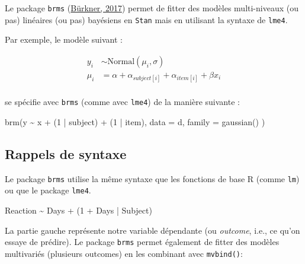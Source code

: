 \documentclass[
  a4paper,11pt,twoside,onecolumn,openright,final,oldfontcommands]{memoir}
\newenvironment{Shaded}{\begin{snugshade}}{\end{snugshade}}
\newcommand{\AttributeTok}[1]{\textcolor[rgb]{0.77,0.63,0.00}{#1}}
\newcommand{\DecValTok}[1]{\textcolor[rgb]{0.00,0.00,0.81}{#1}}
\newcommand{\FunctionTok}[1]{\textcolor[rgb]{0.00,0.00,0.00}{#1}}
\newcommand{\NormalTok}[1]{#1}
\newcommand{\SpecialCharTok}[1]{\textcolor[rgb]{0.00,0.00,0.00}{#1}}
\theoremstyle{definition}
\theoremstyle{definition}
\theoremstyle{definition}
\theoremstyle{remark}
\begin{document}
Le package \texttt{brms} (\href{https://www.jstatsoft.org/article/view/v080i01}{Bürkner, 2017}) permet de fitter des modèles multi-niveaux (ou pas) linéaires (ou pas) bayésiens en \texttt{Stan} mais en utilisant la syntaxe de \texttt{lme4}.

Par exemple, le modèle suivant :

\[
\begin{aligned}
y_{i} &\sim \mathrm{Normal}(\mu_{i}, \sigma) \\
\mu_{i} &= \alpha + \alpha_{subject[i]} + \alpha_{item[i]} + \beta x_{i} \\
\end{aligned}
\]

se spécifie avec \texttt{brms} (comme avec \texttt{lme4}) de la manière suivante :

\begin{Shaded}
\begin{Highlighting}[]
\FunctionTok{brm}\NormalTok{(y }\SpecialCharTok{\textasciitilde{}}\NormalTok{ x }\SpecialCharTok{+}\NormalTok{ (}\DecValTok{1} \SpecialCharTok{|}\NormalTok{ subject) }\SpecialCharTok{+}\NormalTok{ (}\DecValTok{1} \SpecialCharTok{|}\NormalTok{ item), }\AttributeTok{data =}\NormalTok{ d, }\AttributeTok{family =} \FunctionTok{gaussian}\NormalTok{() )}
\end{Highlighting}
\end{Shaded}

\hypertarget{rappels-de-syntaxe}{%
\subsection{Rappels de syntaxe}\label{rappels-de-syntaxe}}

Le package \texttt{brms} utilise la même syntaxe que les fonctions de base R (comme \texttt{lm}) ou que le package \texttt{lme4}.

\begin{Shaded}
\begin{Highlighting}[]
\NormalTok{Reaction }\SpecialCharTok{\textasciitilde{}}\NormalTok{ Days }\SpecialCharTok{+}\NormalTok{ (}\DecValTok{1} \SpecialCharTok{+}\NormalTok{ Days }\SpecialCharTok{|}\NormalTok{ Subject)}
\end{Highlighting}
\end{Shaded}

La partie gauche représente notre variable dépendante (ou \emph{outcome}, i.e., ce qu'on essaye de prédire). Le package \texttt{brms} permet également de fitter des modèles multivariés (plusieurs outcomes) en les combinant avec \texttt{mvbind()}:
\end{document}
